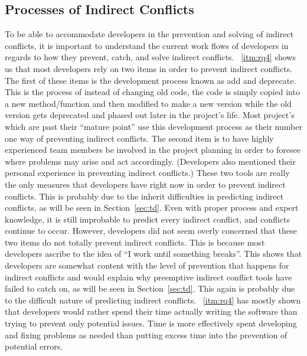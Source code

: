 \documentclass[conference]{IEEEtran}
\begin{document}
\subsection{Processes of Indirect Conflicts}
\label{sec:pd}

To be able to accommodate developers in the prevention and solving of indirect conflicts, it is important to understand the current
work flows of developers in regards to how they prevent, catch, and solve indirect conflicts. ~\ref{itm:rq4} shows us that most developers rely on
two items in order to prevent indirect conflicts. The first of these items is the development process known as add and deprecate. This
is the process of instead of changing old code, the code is simply copied into a new method/function and then modified to make a new 
version while the old version gets deprecated and phased out later in the project's life. Most project's which are past their ``mature point''
use this development process as their number one way of preventing indirect conflicts. The second item is to have highly experienced team
members be involved in the project planning in order to foresee where problems may arise and act accordingly. (Developers also mentioned
their personal experience in preventing indirect conflicts.) These two tools are really the only measures that developers have right now
in order to prevent indirect conflicts. This is probably due to the inherit difficulties in predicting indirect conflicts, as will be seen in
Section~\ref{sec:td}. Even with proper process and expert knowledge, it is still improbable to predict every indirect conflict, and conflicts 
continue to occur. However, developers did not seem overly concerned that these two items do not totally prevent indirect conflicts. This
is because most developers ascribe to the idea of ``I work until something breaks''. This shows that developers are somewhat content with
the level of prevention that happens for indirect conflicts and would explain why preemptive indirect conflict tools have failed to catch on,
as will be seen in Section~\ref{sec:td}. This again is probably due to the difficult nature of predicting indirect conflicts. ~\ref{itm:rq4} has mostly
shown that developers would rather spend their time actually writing the software than trying to prevent only potential issues. Time is
more effectively spent developing and fixing problems as needed than putting excess time into the prevention of potential errors.
\end{document}

